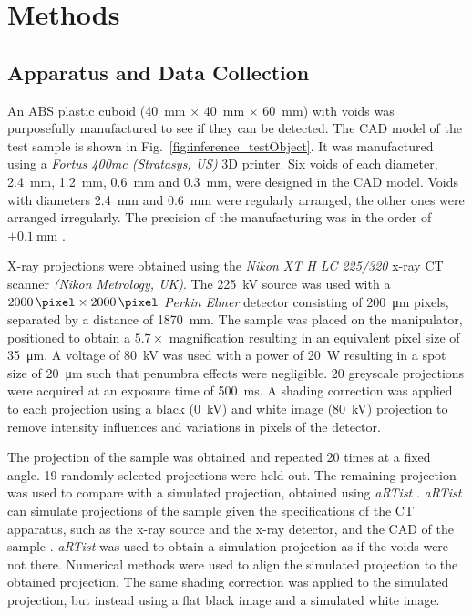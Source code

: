 \documentclass{article}
\begin{document}
\section{Methods}

\subsection{Apparatus and Data Collection}
\label{subsection:appratus}

An ABS plastic cuboid (\SI{40}{\milli\metre} $\times$ \SI{40}{\milli\metre} $\times$ \SI{60}{\milli\metre}) with voids was purposefully manufactured to see if they can be detected. The CAD model of the test sample is shown in Fig.~\ref{fig:inference_testObject}. It was manufactured using a \emph{Fortus 400mc (Stratasys, US)} 3D printer. Six voids of each diameter, \SI{2.4}{\milli\metre}, \SI{1.2}{\milli\metre}, \SI{0.6}{\milli\metre} and \SI{0.3}{\milli\metre}, were designed in the CAD model. Voids with diameters \SI{2.4}{\milli\metre} and \SI{0.6}{\milli\metre} were regularly arranged, the other ones were arranged irregularly. The precision of the manufacturing was in the order of $\pm\SI{0.1}{\milli\metre}$ \citep{hanseen2013fortus}.

X-ray projections were obtained using the \emph{Nikon XT H LC 225/320} x-ray CT scanner \emph{(Nikon Metrology, UK)}. The \SI{225}{\kilo\volt} source was used with a $\SI{2000}{\pixel}\times\SI{2000}{\pixel}$ \emph{Perkin Elmer} detector consisting of \SI{200}{\micro\metre} pixels, separated by a distance of \SI{1870}{\milli\metre}. The sample was placed on the manipulator, positioned to obtain a $5.7\times$ magnification resulting in an equivalent pixel size of \SI{35}{\micro\metre}. A voltage of \SI{80}{\kilo\volt} was used with a power of \SI{20}{\watt} resulting in a spot size of \SI{20}{\micro\metre} such that penumbra effects \citep{kueh2016modelling} were negligible. 20 greyscale projections were acquired at an exposure time of \SI{500}{\milli\second}. A shading correction \citep{munzenmayer2003enhancing, young2000shading} was applied to each projection using a black (\SI{0}{\kilo\volt}) and white image (\SI{80}{\kilo\volt}) projection to remove intensity influences and variations in pixels of the detector.

The projection of the sample was obtained and repeated 20 times at a fixed angle. 19 randomly selected projections were held out. The remaining projection was used to compare with a simulated projection, obtained using \emph{aRTist} \citep{bellon2012radiographic, bellon2007artist, jaenisch2008artist}. \emph{aRTist} can simulate projections of the sample given the specifications of the CT apparatus, such as the x-ray source and the x-ray detector, and the
CAD of the sample \citep{bellon2011simulation, deresch2012simulating}. \emph{aRTist} was used to obtain a simulation projection as if the voids were not there. Numerical methods were used to align the simulated projection to the obtained projection. The same shading correction was applied to the simulated projection, but instead using a flat black image and a simulated white image.
\end{document}
